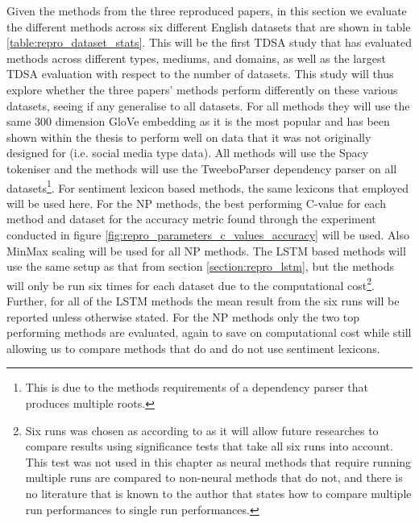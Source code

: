 Given the methods from the three reproduced papers, in this section we evaluate the different methods across six different English datasets that are shown in table \ref{table:repro_dataset_stats}. This will be the first TDSA study that has evaluated methods across different types, mediums, and domains, as well as the largest TDSA evaluation with respect to the number of datasets. This study will thus explore whether the three papers' methods perform differently on these various datasets, seeing if any generalise to all datasets. For all methods they will use the same 300 dimension GloVe embedding as it is the most popular and has been shown within the thesis to perform well on data that it was not originally designed for (i.e. social media type data). All methods will use the Spacy tokeniser and the \citet{wang-etal-2017-tdparse} methods will use the TweeboParser \citep{kong-etal-2014-dependency} dependency parser on all datasets\footnote{This is due to the methods requirements of a dependency parser that produces multiple roots.}. For sentiment lexicon based methods, the same lexicons that \citet{wang-etal-2017-tdparse} employed will be used here. For the NP methods, the best performing C-value for each method and dataset for the accuracy metric found through the experiment conducted in figure \ref{fig:repro_parameters_c_values_accuracy} will be used. Also MinMax scaling will be used for all NP methods. The LSTM based methods will use the same setup as that from section \ref{section:repro_lstm}, but the methods will only be run six times for each dataset due to the computational cost\footnote{Six runs was chosen as according to \citet{reimers2018comparing} as it will allow future researches to compare results using significance tests that take all six runs into account. This test was not used in this chapter as neural methods that require running multiple runs are compared to non-neural methods that do not, and there is no literature that is known to the author that states how to compare multiple run performances to single run performances.}. Further, for all of the LSTM methods the mean result from the six runs will be reported unless otherwise stated. For the NP methods only the two top performing methods are evaluated, again to save on computational cost while still allowing us to compare methods that do and do not use sentiment lexicons. 

